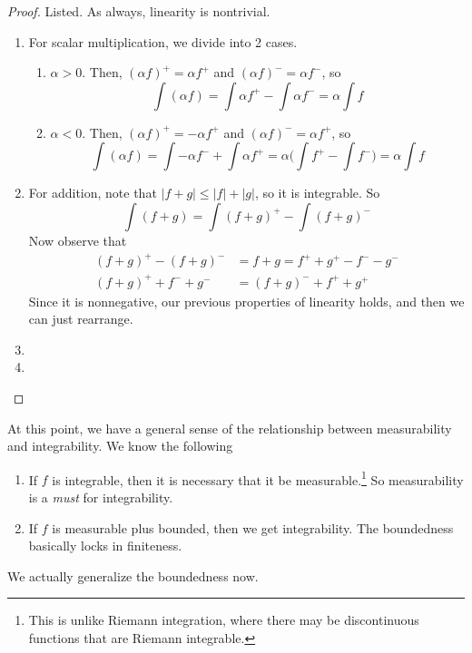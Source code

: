   \begin{proof}
    Listed. As always, linearity is nontrivial. 
    \begin{enumerate}
      \item For scalar multiplication, we divide into 2 cases. 
        \begin{enumerate}
          \item $\alpha > 0$. Then, $(\alpha f)^+ = \alpha f^+$ and $(\alpha f)^- = \alpha f^-$, so 
            \begin{equation}
              \int (\alpha f) = \int \alpha f^+ - \int \alpha f^- = \alpha \int f
            \end{equation}

          \item $\alpha < 0$. Then, $(\alpha f)^+ = - \alpha f^+$ and $(\alpha f)^- = \alpha f^+$, so 
            \begin{equation}
              \int (\alpha f) = \int -\alpha f^- + \int \alpha f^+ = \alpha \bigg( \int f^+ - \int f^- \bigg) = \alpha \int f
            \end{equation}
        \end{enumerate}
      \item For addition, note that $|f + g| \leq |f| + |g|$, so it is integrable. So 
        \begin{equation}
          \int (f + g) = \int (f + g)^+ - \int (f + g)^- 
        \end{equation}
        Now observe that 
        \begin{align}
          (f + g)^+ - (f + g)^- & = f + g = f^+ + g^+ - f^- - g^- \\ 
          (f + g)^+ + f^- + g^- & = (f + g)^- + f^+ + g^+ 
        \end{align}
        Since it is nonnegative, our previous properties of linearity holds, and then we can just rearrange. 
      \item 
      \item 
    \end{enumerate}
  \end{proof}

  At this point, we have a general sense of the relationship between measurability and integrability. We know the following 
  \begin{enumerate}
    \item If $f$ is integrable, then it is necessary that it be measurable.\footnote{This is unlike Riemann integration, where there may be discontinuous functions that are Riemann integrable. } So measurability is a \textit{must} for integrability. 
    \item If $f$ is measurable plus bounded, then we get integrability. The boundedness basically locks in finiteness. 
  \end{enumerate}
  We actually generalize the boundedness now. 

